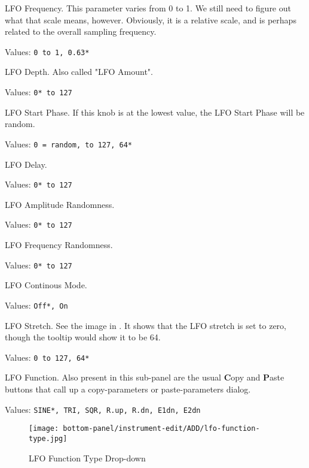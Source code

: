    \setcounter{ItemCounter}{0}      %

   LFO Frequency.
   This parameter varies from 0 to 1.
   We still need to figure out what that scale means, however.
   Obviously, it is a relative scale, and is perhaps related to the
   overall sampling frequency.

   Values: \texttt{0 to 1, 0.63*}

   LFO Depth.  Also called "LFO Amount".

   Values: \texttt{0* to 127}

   LFO Start Phase. If this knob is at the lowest value, the LFO Start
   Phase will be random.

   Values: \texttt{0 = random, to 127, 64*}

   LFO Delay.

   Values: \texttt{0* to 127}

   LFO Amplitude Randomness.

   Values: \texttt{0* to 127}

   LFO Frequency Randomness.

   Values: \texttt{0* to 127}

   LFO Continous Mode.

   Values: \texttt{Off*, On}

   LFO Stretch. See the image in
   .
   It shows that the LFO stretch is set to zero,
   though the tooltip would show it to be 64.

   Values: \texttt{0 to 127, 64*}

   LFO Function.
   Also present in this sub-panel are the usual \textbf{C}opy
   and \textbf{P}aste buttons that call up a copy-parameters or
   paste-parameters dialog.

   Values: \texttt{SINE*, TRI, SQR, R.up, R.dn, E1dn, E2dn}

\begin{figure}[H]
   \centering 
   \texttt{[image: bottom-panel/instrument-edit/ADD/lfo-function-type.jpg]}
   \caption[LFO Type Drop-down]{LFO Function Type Drop-down}
   \label{fig:lfo_function_type_dropdown}
\end{figure}

